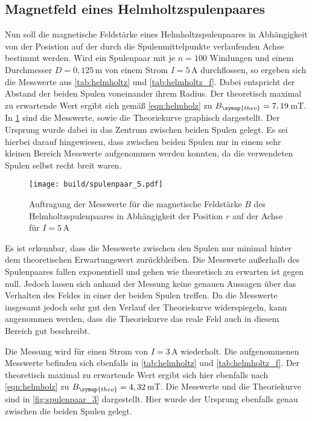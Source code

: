 \newpage
\subsection{Magnetfeld eines Helmholtzspulenpaares}

Nun soll die magnetische Feldstärke eines Helmholtzspulenpaares in Abhängigkeit von
der Posistion auf der durch die Spulenmittelpunkte verlaufenden Achse bestimmt werden.
Wird ein Spulenpaar mit je $n=100$ Windungen und einem Durchmesser $D=0,125$\,m
von einem Strom $I=5$\,A durchflossen, so ergeben sich die Messwerte aus \ref{tab:helmholtz}
und \ref{tab:helmholtz_f}.
Dabei entspricht der Abstand der beiden Spulen voneinander ihrem Radius.
Der theoretisch maximal zu erwartende Wert ergibt sich gemäß \ref{eqn:helmholz} zu $B_{\symup{theo}}=7,19$\,mT. In
\ref{fig:spulenpaar_5} sind die Messwerte, sowie die Theoriekurve graphisch dargestellt. Der Ursprung wurde
dabei in das Zentrum zwischen beiden Spulen gelegt. Es sei hierbei darauf
hingewiesen, dass zwischen beiden Spulen nur in einem sehr kleinen Bereich Messwerte
aufgenommen werden konnten, da die verwendeten Spulen selbst recht breit waren.

\begin{figure}
  \centering
  \texttt{[image: build/spulenpaar\_5.pdf]}
  \caption{Auftragung der Messwerte für die magnetische Feldstärke $B$ des Helmholtzspulenpaares
  in Abhängigkeit der Position $r$ auf der Achse für $I=5$\,A}
  \label{fig:spulenpaar_5}
\end{figure}

Es ist erkennbar, dass die Messwerte zwischen den Spulen nur minimal hinter dem theoretischen Erwartungswert
zurückbleiben. Die Messwerte außerhalb des Spulenpaares fallen exponentiell und gehen
wie theoretisch zu erwarten ist gegen null. Jedoch lassen sich anhand der Messung keine
genauen Aussagen über das Verhalten des Feldes in einer der beiden Spulen treffen.
Da die Messwerte insgesamt jedoch sehr gut den Verlauf der Theoriekurve widerspiegeln,
kann angenommen werden, dass die Theoriekurve das reale Feld auch in diesem Bereich gut beschreibt.


Die Messung wird für einen Strom von $I=3$\,A wiederholt. Die aufgenommenen Messwerte
befinden sich ebenfalls in \ref{tab:helmholtz} und \ref{tab:helmholtz_f}. Der theoretisch maximal zu
erwartende Wert ergibt sich hier ebenfalls nach \ref{eqn:helmholz} zu $B_{\symup{theo}}=4,32$\,mT. Die Messwerte
und die Theoriekurve sind in \ref{fig:spulenpaar_3} dargestellt. Hier wurde der Ursprung ebenfalls genau
zwischen die beiden Spulen gelegt.

